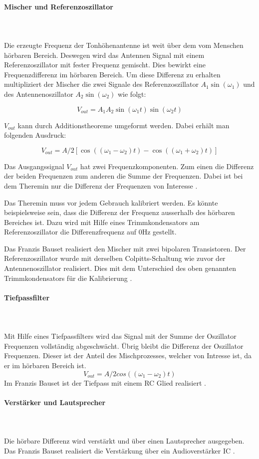 \paragraph{Mischer und Referenzoszillator}\mbox{}\\ 
\\Die erzeugte Frequenz der Tonhöhenantenne ist weit über dem vom Menschen hörbaren Bereich. Deswegen wird das Antennen Signal mit einem Referenzoszillator mit fester Frequenz gemischt. Dies bewirkt eine Frequenzdifferenz im hörbaren Bereich.
Um diese Differenz zu erhalten multipliziert der Mischer die zwei Signale des Referenzoszillator $A_1\sin(\omega_1)$  und des Antennenoszillator $A_2\sin(\omega_2)$ wie folgt:

\begin{equation}
V_{out} = A_{1}A_{2} \sin(\omega_{1}t)   \sin(\omega_{2}t) 
\label{equ:mischer}
\end{equation}

$V_{out}$ kann durch Additionstheoreme umgeformt werden. Dabei erhält man folgenden Ausdruck:

\begin{equation}
V_{out} = A/2[\cos((\omega_{1}-\omega_{2})t)  - \cos((\omega_{1}+\omega_{2})t) ]
\label{equ:mischer_trigo}
\end{equation}

Das Ausgangssignal $V_{out}$ hat zwei Frequenzkomponenten. Zum einen die Differenz der beiden Frequenzen zum anderen die Summe der Frequenzen. Dabei ist bei dem Theremin nur die Differenz der Frequenzen von Interesse \cite{physik_theremin}.

Das Theremin muss vor jedem Gebrauch kalibriert werden. Es könnte beispielsweise sein, dass die Differenz der Frequenz ausserhalb des hörbaren Bereiches ist. Dazu wird mit Hilfe eines Trimmkondensators am Referenzoszillator die Differenzfrequenz auf 0Hz gestellt.

Das Franzis Bauset realisiert den Mischer mit zwei bipolaren Transistoren. Der Referenzoszillator wurde mit derselben Colpitts-Schaltung wie zuvor der Antennenoszillator realisiert. Dies mit dem Unterschied des oben genannten Trimmkondensators für die Kalibrierung \cite{Franzis}.

 


\paragraph{Tiefpassfilter}\mbox{}\\ 
\\Mit Hilfe eines Tiefpassfilters wird das Signal mit der Summe der Oszillator Frequenzen vollständig abgeschwächt. Übrig bleibt die Differenz der Oszillator Frequenzen. Dieser ist der Anteil des Mischprozesses, welcher von Intresse ist, da er im hörbaren Bereich ist.
\begin{equation}
V_{out} = A/2cos((\omega_{1}-\omega_{2})t) 
\label{equ:mischer_trigo}
\end{equation}
Im Franzis Bauset ist der Tiefpass mit einem RC Glied realisiert \cite{Franzis}.

\paragraph{Verstärker und  Lautsprecher}\mbox{}\\ 
\\Die hörbare Differenz wird verstärkt und über einen Lautsprecher ausgegeben.
Das Franzis Bauset realisiert die Verstärkung über ein Audioverstärker IC \cite{Franzis}. 
